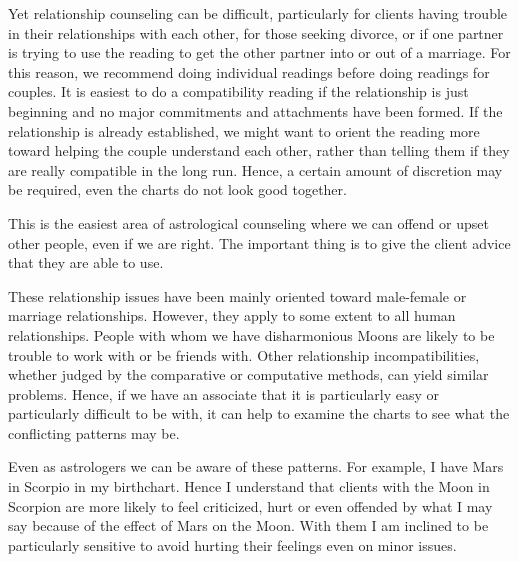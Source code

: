  

Yet relationship counseling can be difficult, particularly for clients having trouble in their relationships with each other, for those seeking divorce, or if one partner is trying to use the reading to get the other partner into or out of a marriage. For this reason, we recommend doing individual readings before doing readings for couples. It is easiest to do a compatibility reading if the relationship is just beginning and no major commitments and attachments have been formed. If the relationship is already established, we might want to orient the reading more toward helping the couple understand each other, rather than telling them if they are really compatible in the long run. Hence, a certain amount of discretion may be required, even the charts do not look good together.

 

This is the easiest area of astrological counseling where we can offend or upset other people, even if we are right. The important thing is to give the client advice that they are able to use.

 

These relationship issues have been mainly oriented toward male-female or marriage relationships. However, they apply to some extent to all human relationships. People with whom we have disharmonious Moons are likely to be trouble to work with or be friends with. Other relationship incompatibilities, whether judged by the comparative or computative methods, can yield similar problems. Hence, if we have an associate that it is particularly easy or particularly difficult to be with, it can help to examine the charts to see what the conflicting patterns may be.

 

Even as astrologers we can be aware of these patterns. For example, I have Mars in Scorpio in my birthchart. Hence I understand that clients with the Moon in Scorpion are more likely to feel criticized, hurt or even offended by what I may say because of the effect of Mars on the Moon. With them I am inclined to be particularly sensitive to avoid hurting their feelings even on minor issues.